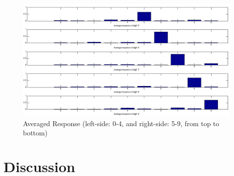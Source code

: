 \documentclass[12pt]{article}
\begin{document}
\begin{enumerate}
\begin{figure}[ht]
		\includegraphics[scale=.28]{../res/resp5-9.png}
		\caption{Averaged Response (left-side: 0-4, and right-side: 5-9, from top to bottom)}
	\end{figure}
	
\end{enumerate}

\newpage
\section*{Discussion}
\vspace{-20pt}
\noindent\makebox[\linewidth]{\rule{\textwidth}{0.4pt}}
\end{document}

